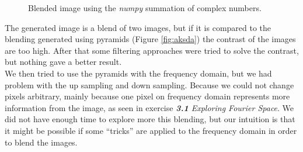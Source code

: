 \documentclass[12pt,a4paper]{article}
\begin{document}
\begin{figure}[!h]
	\centering
	{%
		\setlength{\fboxsep}{1pt}%
		\setlength{\fboxrule}{1pt}%
	}%
	\caption{Blended image using the \emph{numpy} summation of complex numbers.}
	\label{fig:fourier2}
\end{figure}

The generated image is a blend of two images, but if it is compared to the blending generated using pyramids (Figure \ref{fig:aksda}) the contrast of the images are too high. After that some filtering approaches were tried to solve the contrast, but nothing gave a better result. \\

We then tried to use the pyramids with the frequency domain, but we had problem with the up sampling and down sampling. Because we could not change pixels arbitrary, mainly because one pixel on frequency domain represents more information from the image, as seen in exercise \emph{\textbf{3.1} Exploring Fourier Space}. We did not have enough time to explore more this blending, but our intuition is that it might be possible if some ``tricks'' are applied to the frequency domain in order to blend the images. 
\end{document}
